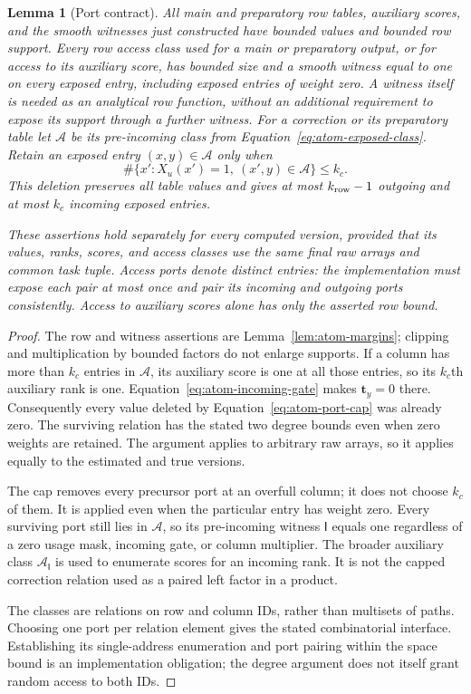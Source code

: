 \documentclass[11pt]{article}
\numberwithin{equation}{section}
\newtheorem{lemma}[theorem]{Lemma}
\theoremstyle{definition}
\theoremstyle{remark}
\begin{document}
\begin{lemma}[Port contract]
\label{lem:atom-ports}
All main and preparatory row tables, auxiliary scores, and the smooth
witnesses just constructed have bounded values and bounded row support.
Every row access class used for a main or preparatory output, or for
access to its auxiliary score, has bounded size and a smooth witness
equal to one on every exposed entry, including exposed entries of weight
zero.  A witness itself is needed as an analytical row function, without
an additional requirement to expose its support through a further
witness.  For a correction or its preparatory table let ${\mathcal{A}}$ be its
pre-incoming class from Equation~\eqref{eq:atom-exposed-class}.  Retain an
exposed entry $(x,y)\in {\mathcal{A}}$ only when
\begin{equation}
 \#\{x':X_u(x')=1,\ (x',y)\in {\mathcal{A}}\}\le {k}_c.
 \label{eq:atom-port-cap}
\end{equation}
This deletion preserves all table values and gives at most ${k_{\rm row}}-1$
outgoing and at most ${k}_c$ incoming exposed entries.

These assertions hold separately for every computed version, provided
that its values, ranks, scores, and access classes use the same final
raw arrays and common task tuple.  Access ports denote distinct entries:
the implementation must expose each pair at most once and pair its
incoming and outgoing ports consistently.  Access to auxiliary scores
alone has only the asserted row bound.
\end{lemma}

\begin{proof}
The row and witness assertions are Lemma~\ref{lem:atom-margins}; clipping
and multiplication by bounded factors do not enlarge supports.
If a column has more than ${k}_c$ entries in ${\mathcal{A}}$, its auxiliary score is
one at all those entries, so its ${k}_c$th auxiliary rank is one.
Equation~\eqref{eq:atom-incoming-gate} makes ${\mathbf{t}}_y=0$ there.  Consequently
every value deleted by Equation~\eqref{eq:atom-port-cap} was already zero.
The surviving relation has the stated two degree bounds even when zero
weights are retained.  The argument applies to arbitrary raw arrays, so
it applies equally to the estimated and true versions.

The cap removes every precursor port at an overfull column; it does
not choose ${k}_c$ of them.  It is applied even when the particular entry
has weight zero.  Every surviving port still lies in ${\mathcal{A}}$, so its
pre-incoming witness ${\mathsf{I}}$ equals one regardless of a zero usage mask,
incoming gate, or column multiplier.  The broader auxiliary class
${\mathcal{A}}_{\mathsf{I}}$ is used to enumerate scores for an incoming rank.  It is not the
capped correction relation used as a paired left factor in a product.

The classes are relations on row and column IDs, rather than multisets
of paths.  Choosing one port per relation element gives the stated
combinatorial interface.  Establishing its single-address enumeration
and port pairing within the space bound is an implementation obligation;
the degree argument does not itself grant random access to both IDs.
\end{proof}
\end{document}
